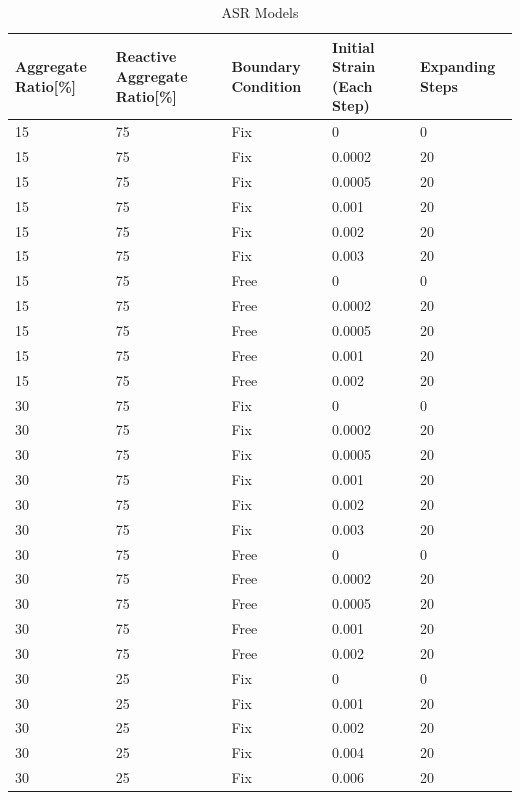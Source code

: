 \begin{table}[ht!]
\centering
\begin{tabular}{ ||p{2cm}|p{2cm}|p{2cm}|p{2cm}|p{2cm}|| }
 \hline
 Aggregate Ratio[\%] &  Reactive Aggregate Ratio[\%] & Boundary Condition & Initial Strain (Each Step) & Expanding Steps \\ [0.5ex]
 \hline\hline
 15 & 75 & Fix & 0 & 0 \\
 15 & 75 & Fix & 0.0002 & 20 \\
 15 & 75 & Fix & 0.0005 & 20 \\
 15 & 75 & Fix & 0.001 & 20 \\
 15 & 75 & Fix & 0.002 & 20 \\
 15 & 75 & Fix & 0.003 & 20 \\

 15 & 75 & Free & 0 & 0 \\
 15 & 75 & Free & 0.0002 & 20 \\
 15 & 75 & Free & 0.0005 & 20 \\
 15 & 75 & Free & 0.001 & 20 \\
 15 & 75 & Free & 0.002 & 20 \\

 30 & 75 & Fix & 0 & 0 \\
 30 & 75 & Fix & 0.0002 & 20 \\
 30 & 75 & Fix & 0.0005 & 20 \\
 30 & 75 & Fix & 0.001 & 20 \\
 30 & 75 & Fix & 0.002 & 20 \\
 30 & 75 & Fix & 0.003 & 20 \\

 30 & 75 & Free & 0 & 0 \\
 30 & 75 & Free & 0.0002 & 20 \\
 30 & 75 & Free & 0.0005 & 20 \\
 30 & 75 & Free & 0.001 & 20 \\
 30 & 75 & Free & 0.002 & 20 \\

 30 & 25 & Fix & 0 & 0 \\
 30 & 25 & Fix & 0.001 & 20 \\
 30 & 25 & Fix & 0.002 & 20 \\
 30 & 25 & Fix & 0.004 & 20 \\
 30 & 25 & Fix & 0.006 & 20 \\  [0.5ex]
 \hline
\end{tabular}
\caption{ASR Models}
\label{table:ASR_MODELS}
\end{table}

